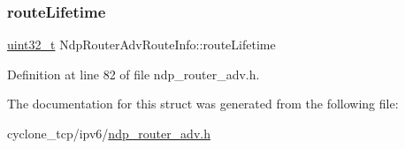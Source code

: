 \subsubsection{\texorpdfstring{route\+Lifetime}{routeLifetime}}
{\footnotesize\ttfamily \hyperlink{stdint_8h_a435d1572bf3f880d55459d9805097f62}{uint32\+\_\+t} Ndp\+Router\+Adv\+Route\+Info\+::route\+Lifetime}



Definition at line 82 of file ndp\+\_\+router\+\_\+adv.\+h.



The documentation for this struct was generated from the following file\+:\begin{DoxyCompactItemize}
\item 
cyclone\+\_\+tcp/ipv6/\hyperlink{ndp__router__adv_8h}{ndp\+\_\+router\+\_\+adv.\+h}\end{DoxyCompactItemize}
